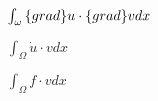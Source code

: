 \documentclass{article}
\begin{document}
$ \int_\omega \text\{grad\} u \cdot \text\{grad\} v dx $
\pagebreak

$ \int_\Omega \dot{u}\cdot vdx$
\pagebreak

$ \int_\Omega f\cdot vdx$
\pagebreak
\end{document}
